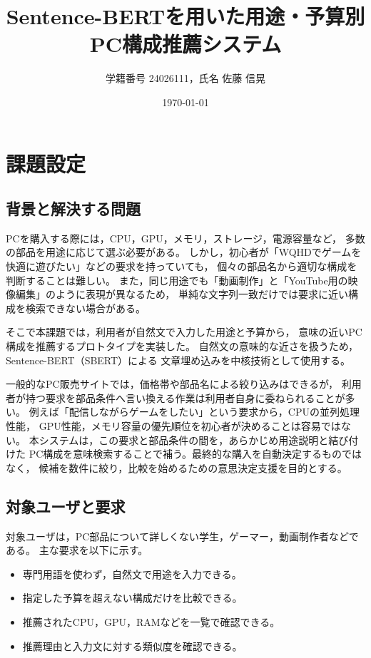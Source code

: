 \documentclass[a4paper,11pt]{article}
\title{Sentence-BERTを用いた用途・予算別PC構成推薦システム}
\author{学籍番号 24026111，氏名 佐藤 信晃}
\date{\today}
\begin{document}
\maketitle

\section{課題設定}

\subsection{背景と解決する問題}
PCを購入する際には，CPU，GPU，メモリ，ストレージ，電源容量など，
多数の部品を用途に応じて選ぶ必要がある。
しかし，初心者が「WQHDでゲームを快適に遊びたい」などの要求を持っていても，
個々の部品名から適切な構成を判断することは難しい。
また，同じ用途でも「動画制作」と「YouTube用の映像編集」のように表現が異なるため，
単純な文字列一致だけでは要求に近い構成を検索できない場合がある。

そこで本課題では，利用者が自然文で入力した用途と予算から，
意味の近いPC構成を推薦するプロトタイプを実装した。
自然文の意味的な近さを扱うため，Sentence-BERT（SBERT）による
文章埋め込みを中核技術として使用する。

一般的なPC販売サイトでは，価格帯や部品名による絞り込みはできるが，
利用者が持つ要求を部品条件へ言い換える作業は利用者自身に委ねられることが多い。
例えば「配信しながらゲームをしたい」という要求から，CPUの並列処理性能，
GPU性能，メモリ容量の優先順位を初心者が決めることは容易ではない。
本システムは，この要求と部品条件の間を，あらかじめ用途説明と結び付けた
PC構成を意味検索することで補う。最終的な購入を自動決定するものではなく，
候補を数件に絞り，比較を始めるための意思決定支援を目的とする。

\subsection{対象ユーザと要求}
対象ユーザは，PC部品について詳しくない学生，ゲーマー，動画制作者などである。
主な要求を以下に示す。

\begin{itemize}
  \item 専門用語を使わず，自然文で用途を入力できる。
  \item 指定した予算を超えない構成だけを比較できる。
  \item 推薦されたCPU，GPU，RAMなどを一覧で確認できる。
  \item 推薦理由と入力文に対する類似度を確認できる。
\end{itemize}
\end{document}
